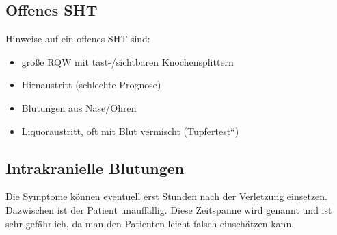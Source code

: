 \subsection{Offenes SHT}

{
Hinweise auf ein offenes SHT sind:

\begin{itemize}
    \item große RQW mit tast-/sichtbaren  Knochensplittern
    \item Hirnaustritt (schlechte Prognose)
    \item Blutungen aus Nase/Ohren
    \item Liquoraustritt, oft mit Blut vermischt
    ({\quotedblbase}Tupfertest{\textquotedblleft})
\end{itemize}
}{

}{}{}{}




\clearpage
\subsection{Intrakranielle Blutungen}

{
Die Symptome können eventuell erst Stunden nach der
Verletzung einsetzen. Dazwischen ist der Patient unauffällig.
Diese Zeitspanne wird  genannt und ist
sehr gefährlich, da man den Patienten leicht falsch
einschätzen kann.
}{

}{}{}{}

